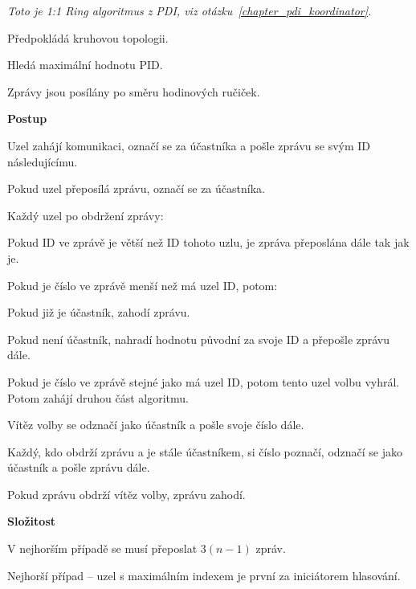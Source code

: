 \begin{compactitem}
    \item \textit{Toto je 1:1 Ring algoritmus z PDI, viz otázku~\ref{chapter_pdi_koordinator}.}

    \item Předpokládá kruhovou topologii.
    \item Hledá maximální hodnotu PID.
    \item Zprávy jsou posílány po směru hodinových ručiček.

    \item \textbf{Postup} \begin{compactenum}
        \item Uzel zahájí komunikaci, označí se za účastníka a pošle zprávu se svým ID následujícímu.
        \item Pokud uzel přeposílá zprávu, označí se za účastníka.
        \item Každý uzel po obdržení zprávy: \begin{compactenum}
            \item Pokud ID ve zprávě je větší než ID tohoto uzlu, je zpráva přeposlána dále tak jak je.
            \item Pokud je číslo ve zprávě menší než má uzel ID, potom: \begin{compactenum}
                \item Pokud již je účastník, zahodí zprávu.
                \item Pokud není účastník, nahradí hodnotu původní za svoje ID a přepošle zprávu dále.
            \end{compactenum}
            \item Pokud je číslo ve zprávě stejné jako má uzel ID, potom tento uzel volbu vyhrál. Potom zahájí druhou část algoritmu.
        \end{compactenum}
        \item Vítěz volby se odznačí jako účastník a pošle svoje číslo dále.
        \item Každý, kdo obdrží zprávu a je stále účastníkem, si číslo poznačí, odznačí se jako účastník a pošle zprávu dále.
        \item Pokud zprávu obdrží vítěz volby, zprávu zahodí.
    \end{compactenum}

    \item \textbf{Složitost} \begin{compactitem}
        \item V nejhorším případě se musí přeposlat $3(n-1)$ zpráv.
        \item Nejhorší případ -- uzel s maximálním indexem je první za iniciátorem hlasování.
    \end{compactitem}


\end{compactitem}
